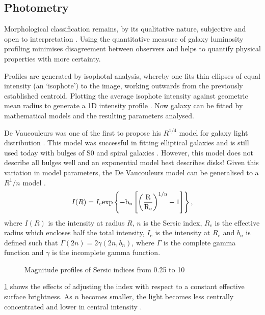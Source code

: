 \subsection{Photometry}
Morphological classification remains, by its qualitative nature, subjective and open to interpretation \citep{naim_automated_1995}. Using the quantitative measure of galaxy luminosity profiling minimises disagreement between observers and helps to quantify physical properties with more certainty. 

Profiles are generated by isophotal analysis, whereby one fits thin ellipses of equal intensity (an `isophote') to the image, working outwards from the previously established centroid. Plotting the average isophote intensity against geometric mean radius to generate a 1D intensity profile \citep{peng_detailed_2002}. Now galaxy can be fitted by mathematical models and the resulting parameters analysed. 

De Vaucouleurs was one of the first to propose his $R^{1/4}$ model for galaxy light distribution \citep{de_vaucouleurs_revised_1963}. This model was successful in fitting elliptical galaxies and is still used today with bulges of S0 and spiral galaxies \citep{allen_millennium_2006}. However, this model does not describe all bulges well and an exponential model best describes disks! Given this variation in model parameters, the De Vaucouleurs model can be generalised to a \sersic $R^1/n$ model \citep{sersic_atlas_1968}.
\begin{equation}
		I(R) = I_{e} \rm{exp}\left\{-b_{n}\left[\left(\frac{R}{R_{e}}\right)^{1/n} - 1\right]\right\},
\end{equation}
where $I(R)$ is the intensity at radius $R$, $n$ is the Sersic index, $R_e$ is the effective radius which encloses half the total intensity, $I_e$ is the intensity at $R_e$ and $b_n$ is defined such that $\Gamma(2n) = 2\gamma(2n, b_n)$, where $\Gamma$ is the complete gamma function and $\gamma$ is the incomplete gamma function.
\begin{figure}[!ht]
		\centering
		\caption{Magnitude profiles of Sersic indices from 0.25 to 10}
		\label{fig:sersic_mags}
	\end{figure}
\ref{fig:sersic_mags} shows the effects of adjusting the \sersic index with respect to a constant effective surface brightness. As $n$ becomes smaller, the light becomes less centrally concentrated and lower in central intensity \citep{graham_concise_2005}. 

